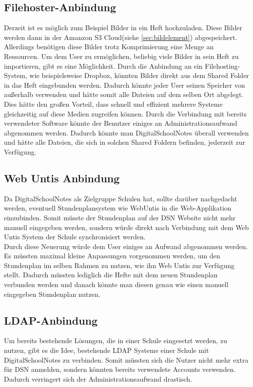 \subsection{Filehoster-Anbindung}
Derzeit ist es möglich zum Beispiel Bilder in ein Heft hochzuladen. Diese Bilder werden dann in der Amanzon S3 Cloud(siehe \ref{sec:bildelement}) abgespeichert. Allerdings benötigen diese Bilder trotz Komprimierung eine Menge an Ressourcen. Um dem User zu ermöglichen, beliebig viele Bilder in sein Heft zu importieren, gibt es eine Möglichkeit. Durch die Anbindung an ein Filehosting-System, wie beispielsweise Dropbox, könnten Bilder direkt aus dem Shared Folder in das Heft eingebunden werden. Dadurch könnte jeder User seinen Speicher von außerhalb verwenden und hätte somit alle Dateien auf dem selben Ort abgelegt.\\
Dies hätte den großen Vorteil, dass schnell und effizient mehrere Systeme gleichzeitig auf diese Medien zugreifen können. Durch die Verbindung mit bereits verwendeter Software könnte der Benutzer einiges an Administrationsaufwand abgenommen werden. Dadurch könnte man DigitalSchoolNotes überall verwenden und hätte alle Dateien, die sich in solchen Shared Foldern befinden, jederzeit zur Verfügung. 
\subsection{Web Untis Anbindung}
Da DigitalSchoolNotes als Zielgruppe Schulen hat, sollte darüber nachgedacht werden, eventuell Stundenplansystem wie WebUntis in die Web-Applikation einzubinden. Somit müsste der Stundenplan auf der DSN Website nicht mehr manuell eingegeben werden, sondern würde direkt nach Verbindung mit dem Web Untis System der Schule synchronisiert werden.\\
Durch diese Neuerung würde dem User einiges an Aufwand abgenommen werden. Es müssten maximal kleine Anpassungen vorgenommen werden, um den Stundenplan im selben Rahmen zu nutzen, wie ihn Web Untis zur Verfügung stellt. Dadurch müssten lediglich die Hefte mit dem neuen Stundenplan verbunden werden und danach könnte man diesen genau wie einen manuell eingegeben Stundenplan nutzen. 
\subsection{LDAP-Anbindung}
Um bereits bestehende Lösungen, die in einer Schule eingesetzt werden, zu nutzen, gibt es die Idee, bestehende LDAP Systeme einer Schule mit DigitalSchoolNotes zu verbinden. Somit müssten sich die Nutzer nicht mehr extra für DSN anmelden, sondern könnten bereits verwendete Accounts verwenden. Dadurch verringert sich der Administrationsaufwand drastisch.

